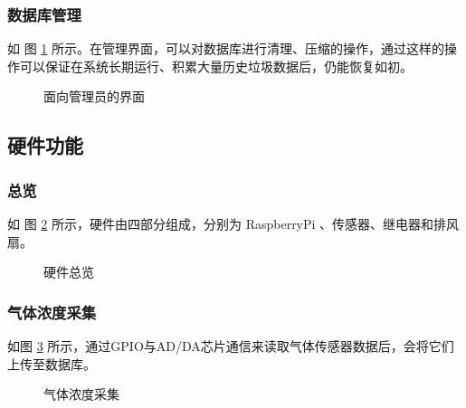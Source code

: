 \documentclass[UTF8]{ctexart}
\begin{document}
\subsubsection{数据库管理}
如 图 \ref{fig:device_admin2} 所示。在管理界面，可以对数据库进行清理、压缩的操作，通过这样的操作可以保证在系统长期运行、积累大量历史垃圾数据后，仍能恢复如初。

\begin{figure}[H]
    \noindent{}
    \caption{面向管理员的界面}\label{fig:device_admin2}
\end{figure}

\subsection{硬件功能}
\subsubsection{总览}
如 图 \ref{fig:device} 所示，硬件由四部分组成，分别为 RaspberryPi 、传感器、继电器和排风扇。
\begin{figure}[H]
    \noindent{}
    \caption{硬件总览}\label{fig:device}
\end{figure}
\subsubsection{气体浓度采集}
如图 \ref{fig:device_report} 所示，通过GPIO与AD/DA芯片通信来读取气体传感器数据后，会将它们上传至数据库。
\begin{figure}[H]
    \noindent{}
    \caption{气体浓度采集}\label{fig:device_report}
\end{figure}
\end{document}
